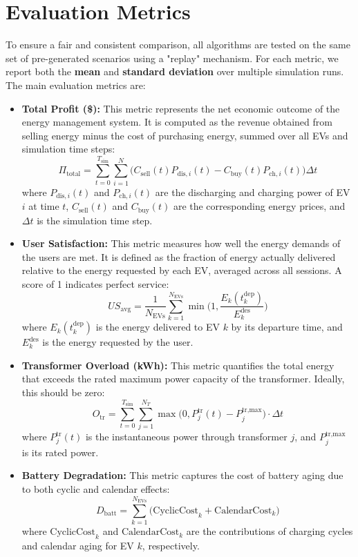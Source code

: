 \section{Evaluation Metrics}

To ensure a fair and consistent comparison, all algorithms are tested on the same set of pre-generated scenarios using a "replay" mechanism. For each metric, we report both the \textbf{mean} and \textbf{standard deviation} over multiple simulation runs. The main evaluation metrics are:

\begin{itemize}
    \item \textbf{Total Profit (\$):}  
    This metric represents the net economic outcome of the energy management system. It is computed as the revenue obtained from selling energy minus the cost of purchasing energy, summed over all EVs and simulation time steps:
    \[
    \Pi_{\text{total}} = \sum_{t=0}^{T_{\text{sim}}} \sum_{i=1}^{N} \Big( C_{\text{sell}}(t) P_{\text{dis},i}(t) - C_{\text{buy}}(t) P_{\text{ch},i}(t) \Big) \Delta t
    \]
    where \(P_{\text{dis},i}(t)\) and \(P_{\text{ch},i}(t)\) are the discharging and charging power of EV \(i\) at time \(t\), \(C_{\text{sell}}(t)\) and \(C_{\text{buy}}(t)\) are the corresponding energy prices, and \(\Delta t\) is the simulation time step.

    \item \textbf{User Satisfaction:}  
    This metric measures how well the energy demands of the users are met. It is defined as the fraction of energy actually delivered relative to the energy requested by each EV, averaged across all sessions. A score of 1 indicates perfect service:
    \[
    US_{\text{avg}} = \frac{1}{N_{\text{EVs}}} \sum_{k=1}^{N_{\text{EVs}}} \min \Big(1, \frac{E_k(t_k^{\text{dep}})}{E_k^{\text{des}}} \Big)
    \]
    where \(E_k(t_k^{\text{dep}})\) is the energy delivered to EV \(k\) by its departure time, and \(E_k^{\text{des}}\) is the energy requested by the user.

    \item \textbf{Transformer Overload (kWh):}  
    This metric quantifies the total energy that exceeds the rated maximum power capacity of the transformer. Ideally, this should be zero:
    \[
    O_{\text{tr}} = \sum_{t=0}^{T_{\text{sim}}} \sum_{j=1}^{N_T} \max\Big(0, P_j^{\text{tr}}(t) - P_j^{\text{tr,max}} \Big) \cdot \Delta t
    \]
    where \(P_j^{\text{tr}}(t)\) is the instantaneous power through transformer \(j\), and \(P_j^{\text{tr,max}}\) is its rated power.

    \item \textbf{Battery Degradation:}  
    This metric captures the cost of battery aging due to both cyclic and calendar effects:
    \[
    D_{\text{batt}} = \sum_{k=1}^{N_{\text{EVs}}} \Big(\text{CyclicCost}_k + \text{CalendarCost}_k \Big)
    \]
    where \(\text{CyclicCost}_k\) and \(\text{CalendarCost}_k\) are the contributions of charging cycles and calendar aging for EV \(k\), respectively.
\end{itemize}

